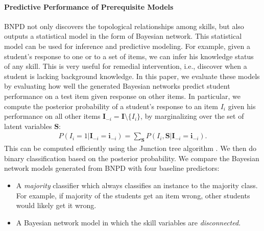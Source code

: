 \documentclass{edm_template}
\begin{document}
{	\paragraph{Predictive Performance of Prerequisite Models}
	\label{sec:predictive_performance}
	BNPD not only discovers the topological relationships among skills, but also outputs a statistical model in the form of Bayesian network.
	This statistical model can be used for inference and predictive modeling.
	For example, given a student's response to one or to a set of items, we can infer his knowledge status of any skill.
	This is very useful for remedial intervention, i.e., discover when a student is lacking background knowledge. 
	In this paper, we evaluate these models by evaluating how well the generated Bayesian networks predict student performance
	on a test item given response on other items.
	In particular, we compute the posterior probability of a student's response to an item $I_i$ given his performance on all other items 
	$\mathbf{I}_{-i}=\mathbf{I}\setminus\{I_i\}$, by marginalizing over the set of latent variables $\mathbf{S}$:
	\begin{align}
		P(I_i=1|\mathbf{I}_{-i}=\mathbf{i}_{-i}) =\sum_{\mathbf{S}}P(I_i, \mathbf{S}|\mathbf{I}_{-i}=\mathbf{i}_{-i}).
	\end{align}
	This can be computed efficiently using the Junction tree algorithm \cite{koller2009probabilistic}. 
	We then do binary classification based on the posterior probability.
	We compare the Bayesian network models generated from BNPD with four baseline predictors:
	\begin{itemize}[topsep=2pt,parsep=0pt,partopsep=0pt]
		\item  A \emph{majority} classifier which always classifies  an instance to the majority class.
		For example, if majority of the students get an item wrong, other students would likely get it wrong.
		\item  A Bayesian network model in which the skill variables are \emph{disconnected}. 

\end{itemize}}
\end{document}
